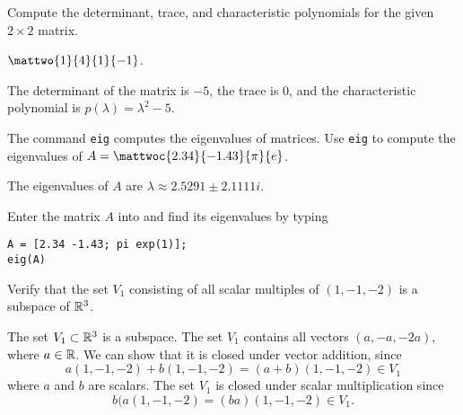\documentclass{article}
\begin{document}

\newpage

\problemlabel

\noindent Compute the determinant, trace, and characteristic polynomials for the given  $2\times 2$ matrix.

\begin{exercise} \label{c6.4.1c}
$\mattwo{1}{4}{1}{-1}$.

\begin{solution}
\soln
The determinant of the matrix is $-5$, the trace is $0$, and
the characteristic polynomial is $p(\lambda)=\lambda^2-5$.

\end{solution}
\end{exercise}





\matlabproblemlabel

\begin{exercise} \label{c7.8.7}
The \Matlab command {\tt eig} computes the eigenvalues
of matrices.  Use {\tt eig} to compute the eigenvalues of 
$A = \mattwoc{2.34}{-1.43}{\pi}{e}$.

\begin{solution}
\ans The eigenvalues of $A$ are $\lambda \approx 2.5291 \pm
2.1111i$.

\soln Enter the matrix $A$ into \Matlab and find its eigenvalues by typing
\begin{verbatim}
A = [2.34 -1.43; pi exp(1)];
eig(A)
\end{verbatim}

\end{solution}
\end{exercise}





\problemlabel

\begin{exercise} \label{c5.1.1}
Verify that the set $V_1$ consisting of all scalar multiples of
$(1,-1,-2)$ is a subspace of $\mathbb R^3$.

\begin{solution}

The set $V_1 \subset \mathbb R^3$ is a subspace.
The set $V_1$ contains all vectors $(a,-a,-2a)$,
where $a \in \mathbb R$.  We can show that it is closed under
vector addition, since
\[
a(1,-1,-2) + b(1,-1,-2) = (a + b)(1,-1,-2) \in V_1
\]
where $a$ and $b$ are scalars.  The set $V_1$ is closed under scalar
multiplication since
\[
b(a(1,-1,-2) = (ba)(1,-1,-2) \in V_1.
\]

\end{solution}
\end{exercise}
\end{document}
